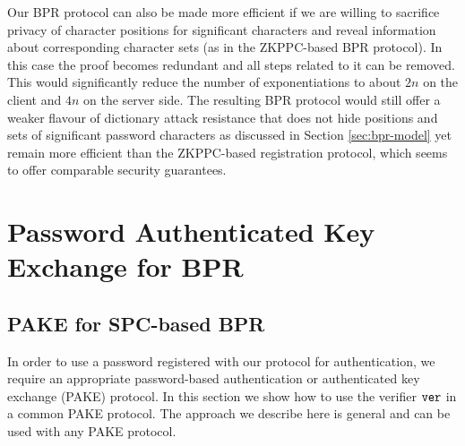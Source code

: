 %
Our \ac{BPR} protocol can also be made more efficient if we are willing to sacrifice privacy of character positions for significant characters and reveal information about corresponding character sets (as in the \ac{ZKPPC}-based \ac{BPR} protocol). 
In this case the proof \PoS becomes redundant and all steps related to it can be removed. 
This would significantly reduce the number of exponentiations to about $2n$ on the client and $4n$ on the server side. 
The resulting \ac{BPR} protocol would still offer a weaker flavour of dictionary attack resistance that does not hide positions and sets of significant password characters as discussed in Section \ref{sec:bpr-model} yet remain more efficient than the \ac{ZKPPC}-based registration protocol, which seems to offer comparable security guarantees.


\section{Password Authenticated Key Exchange for BPR}
\subsection{PAKE for SPC-based BPR}
In order to use a password registered with our protocol for authentication, we require an appropriate password-based authentication or authenticated key exchange (PAKE) protocol.
In this section we show how to use the verifier $\mathtt{ver}$ in a common PAKE protocol. The approach we describe here is general and can be used with any PAKE protocol.


